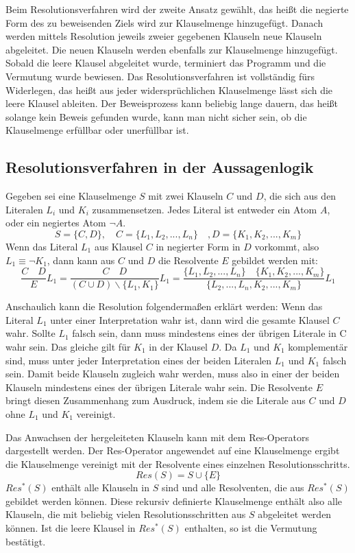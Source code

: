 Beim Resolutionsverfahren wird der zweite Ansatz gewählt, das heißt die negierte Form des zu beweisenden Ziels wird zur Klauselmenge hinzugefügt. Danach werden mittels Resolution jeweils zweier gegebenen Klauseln neue Klauseln abgeleitet. Die neuen Klauseln werden ebenfalls zur Klauselmenge hinzugefügt. Sobald die leere Klausel abgeleitet wurde, terminiert das Programm und die Vermutung wurde bewiesen. Das Resolutionsverfahren ist vollständig fürs Widerlegen, das heißt aus jeder widersprüchlichen Klauselmenge lässt sich die leere Klausel ableiten. Der Beweisprozess kann beliebig lange dauern, das heißt solange kein Beweis gefunden wurde, kann man nicht sicher sein, ob die Klauselmenge erfüllbar oder unerfüllbar ist. \cite{Chang1973Symb}

		\subsection{Resolutionsverfahren in der Aussagenlogik}
Gegeben sei eine Klauselmenge $S$ mit zwei Klauseln $C$ und $D$, die sich aus den Literalen $L_i$ und $K_i$ zusammensetzen. Jedes Literal ist entweder ein Atom $A$, oder ein negiertes Atom $\neg A$.
$$S=\{C,D\}, \quad C=\{L_1, L_2, ..., L_n\}\quad, D=\{K_1, K_2, ..., K_m\}$$
Wenn das Literal $L_1$ aus Klausel $C$ in negierter Form in $D$ vorkommt, also $L_1\equiv\neg K_1$, dann kann aus $C$ und $D$ die Resolvente $E$ gebildet werden mit:
$$\frac{C\quad D}{E}L_1=\frac{C \quad D}{(C \cup D) \backslash \{L_1, K_1\}}L_1
= \frac{\{L_1, L_2, ..., L_n\}\quad\{K_1, K_2, ..., K_m\}}{\{L_2, ..., L_n, K_2, ..., K_m\}}L_1$$

Anschaulich kann die Resolution folgendermaßen erklärt werden: 
Wenn das Literal $L_1$ unter einer Interpretation wahr ist, dann wird die gesamte Klausel $C$ wahr. Sollte $L_1$ falsch sein, dann muss mindestens eines der übrigen Literale in C wahr sein.
Das gleiche gilt für $K_1$ in der Klausel $D$.
Da $L_1$ und $K_1$ komplementär sind, muss unter jeder Interpretation eines der beiden Literalen $L_1$ und $K_1$ falsch sein. Damit beide Klauseln zugleich wahr werden, muss also in einer der beiden Klauseln mindestens eines der übrigen Literale wahr sein. Die Resolvente $E$ bringt diesen Zusammenhang zum Ausdruck, indem sie die Literale aus $C$ und $D$ ohne $L_1$ und $K_1$ vereinigt.

Das Anwachsen der hergeleiteten Klauseln kann mit dem Res-Operators dargestellt werden. Der Res-Operator angewendet auf eine Klauselmenge ergibt die Klauselmenge vereinigt mit der Resolvente eines einzelnen Resolutionsschritts.
$$Res(S)=S \cup \{E\}$$
$Res^*(S)$ enthält alle Klauseln in $S$ sind und alle Resolventen, die aus $Res^*(S)$ gebildet werden können. Diese rekursiv definierte Klauselmenge enthält also alle Klauseln, die mit beliebig vielen Resolutionsschritten aus $S$ abgeleitet werden können. Ist die leere Klausel in $Res^*(S)$ enthalten, so ist die Vermutung bestätigt.
